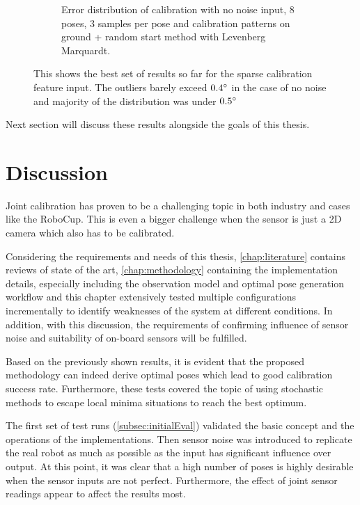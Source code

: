 \documentclass[english, printversion, nomenclature, notitle]{tuvisionthesis} %
\begin{document}
\begin{figure}
\begin{subfigure}{\columnwidth}
		\caption[Error distribution of calibration with no noise input, 8 poses, 3 samples per pose and calibration patterns on ground + random start method with Levenberg Marquardt.]{Error distribution of calibration with no noise input, 8 poses, 3 samples per pose and calibration patterns on ground + random start method with Levenberg Marquardt.}
	\end{subfigure}
	\caption[Error distribition for tests using calibration pattern and stochastic method for Levenberg-marquardt.]{This shows the best set of results so far for the sparse calibration feature input. The outliers barely exceed $0.4\degree$ in the case of no noise and majority of the distribution was under $0.5\degree$}
	\label{fig:final_tests_stockLM}
\end{figure}

Next section will discuss these results alongside the goals of this thesis.

\section{Discussion}

Joint calibration has proven to be a challenging topic in both industry and cases like the RoboCup. This is even a bigger challenge when the sensor is just a 2D camera which also has to be calibrated.

Considering the requirements and needs of this thesis, \cref{chap:literature} contains reviews of state of the art, \cref{chap:methodology} containing the implementation details, especially including the observation model and optimal pose generation workflow and this chapter extensively tested multiple configurations incrementally to identify weaknesses of the system at different conditions. In addition, with this discussion, the requirements of confirming influence of sensor noise and suitability of on-board sensors will be fulfilled.

Based on the previously shown results, it is evident that the proposed methodology can indeed derive optimal poses which lead to good calibration success rate. Furthermore, these tests covered the topic of using stochastic methods to escape local minima situations to reach the best optimum.

The first set of test runs (\cref{subsec:initialEval}) validated the basic concept and the operations of the implementations. Then sensor noise was introduced to replicate the real robot as much as possible as the input has significant influence over output. At this point, it was clear that a high number of poses is highly desirable when the sensor inputs are not perfect. Furthermore, the effect of joint sensor readings appear to affect the results most.
\end{document}
